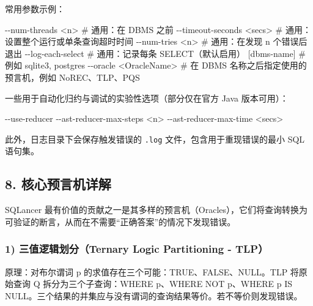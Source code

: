 \documentclass[
]{article}
\newenvironment{Shaded}{}{}
\newcommand{\NormalTok}[1]{#1}
\begin{document}
常用参数示例：

\begin{Shaded}
\begin{Highlighting}[]
\NormalTok{{-}{-}num{-}threads \textless{}n\textgreater{}           \# 通用：在 DBMS 之前}
\NormalTok{{-}{-}timeout{-}seconds \textless{}secs\textgreater{}    \# 通用：设置整个运行或单条查询超时时间}
\NormalTok{{-}{-}num{-}tries \textless{}n\textgreater{}             \# 通用：在发现 n 个错误后退出}
\NormalTok{{-}{-}log{-}each{-}select           \# 通用：记录每条 SELECT（默认启用）}
\NormalTok{[dbms{-}name]                 \# 例如 sqlite3, postgres}
\NormalTok{{-}{-}oracle \textless{}OracleName\textgreater{}       \# 在 DBMS 名称之后指定使用的预言机，例如 NoREC、TLP、PQS}
\end{Highlighting}
\end{Shaded}

一些用于自动化归约与调试的实验性选项（部分仅在官方 Java 版本可用）：

\begin{Shaded}
\begin{Highlighting}[]
\NormalTok{{-}{-}use{-}reducer}
\NormalTok{{-}{-}ast{-}reducer{-}max{-}steps \textless{}n\textgreater{}}
\NormalTok{{-}{-}ast{-}reducer{-}max{-}time \textless{}secs\textgreater{}}
\end{Highlighting}
\end{Shaded}

此外，日志目录下会保存触发错误的 \texttt{.log}
文件，包含用于重现错误的最小 SQL 语句集。

\subsection{8.
核心预言机详解}\label{ux6838ux5fc3ux9884ux8a00ux673aux8be6ux89e3}

SQLancer
最有价值的贡献之一是其多样的预言机（Oracles），它们将查询转换为可验证的断言，从而在不需要``正确答案''的情况下发现错误。

\subsubsection{1) 三值逻辑划分（Ternary Logic Partitioning -
TLP）}\label{ux4e09ux503cux903bux8f91ux5212ux5206ternary-logic-partitioning---tlp}

原理：对布尔谓词 p 的求值存在三个可能：TRUE、FALSE、NULL。TLP 将原始查询
Q 拆分为三个子查询：WHERE p、WHERE NOT p、WHERE p IS
NULL。三个结果的并集应与没有谓词的查询结果等价。若不等价则发现错误。
\end{document}
